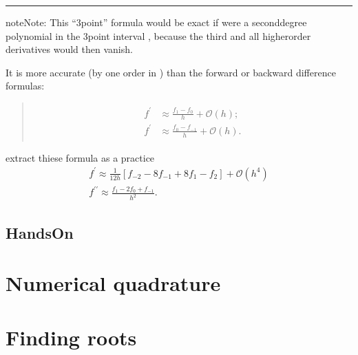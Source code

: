\documentclass[letterpaper,10pt,english]{sphinxmanual}
\begin{document}
\bigskip\hrule\bigskip


\begin{sphinxadmonition}{note}{Note:}
\sphinxAtStartPar
This “3\sphinxhyphen{}point” formula would be exact if  were a second\sphinxhyphen{}degree polynomial in the 3\sphinxhyphen{}point interval \sphinxstyleemphasis{{[}\sphinxhyphen{}h,h{]}},
because the third\sphinxhyphen{} and all higherorder derivatives would then vanish.
\end{sphinxadmonition}

\sphinxAtStartPar
It is more accurate (by one order in  ) than the forward or backward difference formulas:
\begin{quote}
\begin{equation*}
\begin{split}\begin{aligned}
f^{\prime} & \approx \frac{f_{1}-f_{0}}{h}+\mathcal{O}(h) ; \\
f^{\prime} & \approx \frac{f_{0}-f_{-1}}{h}+\mathcal{O}(h) .
\end{aligned}\end{split}
\end{equation*}\end{quote}

\sphinxAtStartPar
extract thiese formula as a practice
\begin{equation*}
\begin{split}f^{\prime} \approx \frac{1}{12 h}\left[f_{-2}-8 f_{-1}+8 f_{1}-f_{2}\right]+\mathcal{O}\left(h^{4}\right) \\
f^{\prime \prime} \approx \frac{f_{1}-2 f_{0}+f_{-1}}{h^{2}} .\end{split}
\end{equation*}

\subsection{Hands\sphinxhyphen{}On}
\label{\detokenize{basicmath/basicmath:hands-on}}

\section{Numerical quadrature}
\label{\detokenize{basicmath/basicmath:numerical-quadrature}}

\section{Finding roots}
\label{\detokenize{basicmath/basicmath:finding-roots}}
\sphinxstepscope
\end{document}

